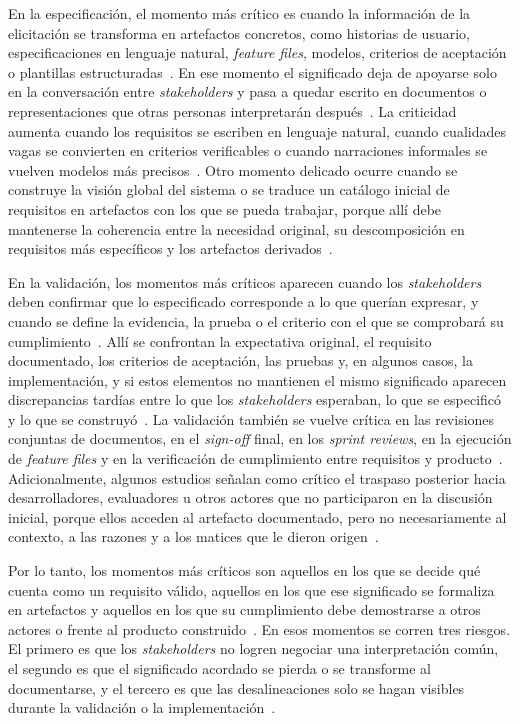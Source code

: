 \documentclass[12pt,letterpaper,oneside]{report}
\begin{document}
En la especificación, el momento más crítico es cuando la información de la
elicitación se transforma en artefactos concretos, como historias de usuario,
especificaciones en lenguaje natural, \textit{feature files}, modelos, criterios
de aceptación o plantillas estructuradas~\cite{irshad2021bdd}. En ese momento
el significado deja de apoyarse solo en la conversación entre
\textit{stakeholders} y pasa a quedar escrito en documentos o representaciones
que otras personas interpretarán después~\cite{ribeiro2020}. La criticidad
aumenta cuando los requisitos se escriben en lenguaje natural, cuando
cualidades vagas se convierten en criterios verificables o cuando narraciones
informales se vuelven modelos más precisos~\cite{laporte2023}. Otro momento
delicado ocurre cuando se construye la visión global del sistema o se traduce
un catálogo inicial de requisitos en artefactos con los que se pueda trabajar,
porque allí debe mantenerse la coherencia entre la necesidad original, su
descomposición en requisitos más específicos y los artefactos
derivados~\cite{kasauli2021}.

En la validación, los momentos más críticos aparecen cuando los
\textit{stakeholders} deben confirmar que lo especificado corresponde a lo que
querían expresar, y cuando se define la evidencia, la prueba o el criterio con
el que se comprobará su cumplimiento~\cite{gentili2025}. Allí se confrontan la
expectativa original, el requisito documentado, los criterios de aceptación,
las pruebas y, en algunos casos, la implementación, y si estos elementos no
mantienen el mismo significado aparecen discrepancias tardías entre lo que los
\textit{stakeholders} esperaban, lo que se especificó y lo que se
construyó~\cite{laporte2023}. La validación también se vuelve crítica en las
revisiones conjuntas de documentos, en el \textit{sign-off} final, en los
\textit{sprint reviews}, en la ejecución de \textit{feature files} y en la
verificación de cumplimiento entre requisitos y producto~\cite{pacheco2022}.
Adicionalmente, algunos estudios señalan como crítico el traspaso posterior
hacia desarrolladores, evaluadores u otros actores que no participaron en la
discusión inicial, porque ellos acceden al artefacto documentado, pero no
necesariamente al contexto, a las razones y a los matices que le dieron
origen~\cite{fricker2015}.

Por lo tanto, los momentos más críticos son aquellos en los que se decide qué
cuenta como un requisito válido, aquellos en los que ese significado se
formaliza en artefactos y aquellos en los que su cumplimiento debe demostrarse
a otros actores o frente al producto construido~\cite{xiao2018}. En esos
momentos se corren tres riesgos. El primero es que los \textit{stakeholders} no
logren negociar una interpretación común, el segundo es que el significado
acordado se pierda o se transforme al documentarse, y el tercero es que las
desalineaciones solo se hagan visibles durante la validación o la
implementación~\cite{okpara2023}.
\end{document}
